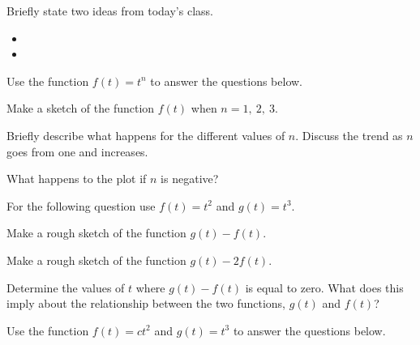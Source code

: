 \begin{problem}
\item Briefly state two ideas from today's class.
  \begin{itemize}
  \item 
  \item 
  \end{itemize}

\item Use the function $f(t)=t^n$ to answer the questions below.

  \scalebox{0.7}{}

  \begin{subproblem}
  \item Make a sketch of the function $f(t)$ when $n=1,~2,~3$.
  \item Briefly describe what happens for the different values of
    $n$. Discuss the trend as $n$ goes from one and increases.
    \vfill
  \item What happens to the plot if $n$ is negative?
    \vfill
  \end{subproblem}

\clearpage

\item For the following question use $f(t)=t^2$ and $g(t)=t^3$.
  \begin{subproblem}
  \item Make a rough sketch of the function $g(t)-f(t)$.  

    \vfill

  \item Make a rough sketch of the function $g(t)-2f(t)$.  

    \vfill

  \item Determine the values of $t$ where $g(t)-f(t)$ is equal to
    zero. What does this imply about the relationship between the two
    functions, $g(t)$ and $f(t)$?

    \vspace{3em}

  \end{subproblem}

  \clearpage


\item Use the function $f(t)=c t^2$ and $g(t)=t^3$ to answer the
  questions below.


\end{problem}
